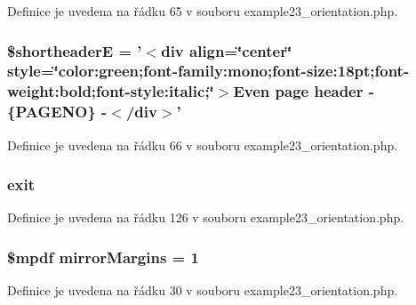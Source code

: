 Definice je uvedena na řádku 65 v souboru example23\-\_\-orientation.\-php.

\hypertarget{example23__orientation_8php_add94d6e47b7fd626f97094b0f2bcd5e2}{
\subsubsection[{\$shortheader\-E}]{\setlength{\rightskip}{0pt plus 5cm}\$shortheader\-E = '$<$div align=\char`\"{}center\char`\"{} style=\char`\"{}color\-:green;font-\/family\-:mono;font-\/size\-:18pt;font-\/weight\-:bold;font-\/style\-:italic;\char`\"{}$>$Even page header -\/ \{P\-A\-G\-E\-N\-O\} -\/$<$/div$>$'}}\label{example23__orientation_8php_add94d6e47b7fd626f97094b0f2bcd5e2}


Definice je uvedena na řádku 66 v souboru example23\-\_\-orientation.\-php.

\hypertarget{example23__orientation_8php_a6733eb5f605d09eaede9845835d71c4e}{
\subsubsection[{exit}]{\setlength{\rightskip}{0pt plus 5cm}exit}}\label{example23__orientation_8php_a6733eb5f605d09eaede9845835d71c4e}


Definice je uvedena na řádku 126 v souboru example23\-\_\-orientation.\-php.

\hypertarget{example23__orientation_8php_a24c284cb7774410f65953584ea1fd9c1}{
\subsubsection[{mirror\-Margins}]{\setlength{\rightskip}{0pt plus 5cm}\$mpdf mirror\-Margins = 1}}\label{example23__orientation_8php_a24c284cb7774410f65953584ea1fd9c1}


Definice je uvedena na řádku 30 v souboru example23\-\_\-orientation.\-php.

